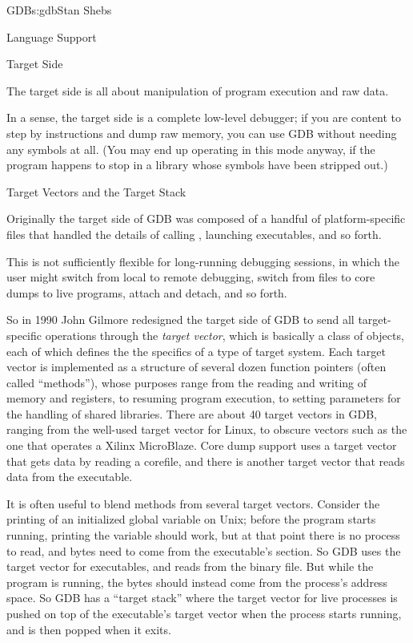 \begin{aosachapter}{GDB}{s:gdb}{Stan Shebs}
\begin{aosasect2}{Language Support}
\end{aosasect2}

\begin{aosasect1}{Target Side}

The target side is all about manipulation of program execution and raw
data.

In a sense, the target side is a complete low-level debugger; if you
are content to step by instructions and dump raw memory, you can use
GDB without needing any symbols at all.  (You may end up operating in
this mode anyway, if the program happens to stop in a library whose
symbols have been stripped out.)

\begin{aosasect2}{Target Vectors and the Target Stack}

Originally the target side of GDB was composed of a handful of
platform-specific files that handled the details of calling
, launching executables, and so forth.

This is not sufficiently flexible for long-running debugging sessions,
in which the user might switch from local to remote debugging, switch
from files to core dumps to live programs, attach and detach, and so
forth.

So in 1990 John Gilmore redesigned the target side of GDB to send all
target-specific operations through the {\em target vector}, which is
basically a class of objects, each of which defines the the specifics
of a type of target system.  Each target vector is implemented as a
structure of several dozen function pointers (often called
``methods''), whose purposes range from the reading and writing of
memory and registers, to resuming program execution, to setting
parameters for the handling of shared libraries.  There are about 40
target vectors in GDB, ranging from the well-used target vector for
Linux, to obscure vectors such as the one that operates a Xilinx
MicroBlaze.  Core dump support uses a target vector that gets data by
reading a corefile, and there is another target vector that reads data
from the executable.

It is often useful to blend methods from several target vectors.
Consider the printing of an initialized global variable on Unix;
before the program starts running, printing the variable should work,
but at that point there is no process to read, and bytes need to come
from the executable's  section.  So GDB uses the target
vector for executables, and reads from the binary file.  But while the
program is running, the bytes should instead come from the process's
address space.  So GDB has a ``target stack'' where the target vector
for live processes is pushed on top of the executable's target vector
when the process starts running, and is then popped when it exits.


\end{aosasect2}
\end{aosasect1}
\end{aosachapter}
